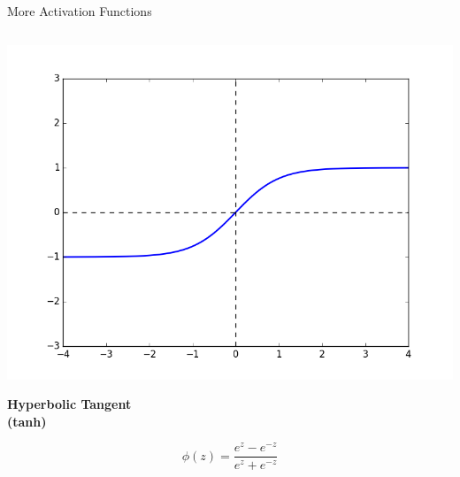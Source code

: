 \documentclass[handout,aspectratio=169]{beamer}
\begin{document}
\begin{frame}{More Activation Functions}
\begin{columns}
    \begin{column}{0.3 \linewidth}
      \includegraphics[width=\linewidth]{pics/act_tanh.png}
      \begin{center}
        {\bf Hyperbolic Tangent} \\
        {\bf (tanh)}
      \end{center}
      \[ \phi(z) = \frac{e^{z} - e^{-z}}{e^{z} + e^{-z}} \]
    \end{column}
  \end{columns}
\end{frame}
\end{document}
